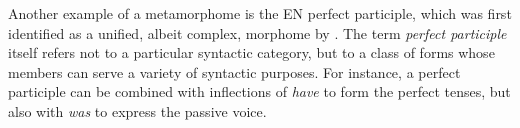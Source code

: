 

Another example of a metamorphome is the \ac{EN} perfect participle, which was first 
identified as a unified, albeit complex, morphome by \cite{aronoff:1994}. The term \emph{perfect participle} 
itself refers not to a particular syntactic category, but 
to a class of 
forms whose members 
can serve a variety of  syntactic purposes. For instance, a perfect participle can be combined
with inflections of \emph{have} to form the perfect tenses, but also with 
\emph{was} to express the passive voice. 

